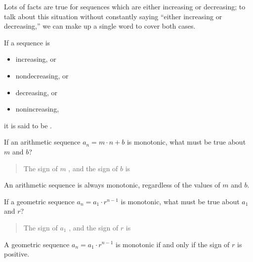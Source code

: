 \documentclass{ximera}
\begin{document}
Lots of facts are true for sequences which are either increasing or
decreasing; to talk about this situation without constantly saying
``either increasing or decreasing,'' we can make up a single word to
cover both cases.
\begin{definition}
  If a sequence is
  \begin{itemize}
  \item increasing, or
  \item nondecreasing, or
  \item decreasing, or
  \item nonincreasing,
  \end{itemize}
  it is said to be .
\end{definition}

\begin{question}
  If an arithmetic sequence $a_n = m\cdot n + b$ is monotonic, what
  must be true about $m$ and $b$?
  \begin{prompt}
    \begin{quote}
      The sign of $m$ , and the sign of $b$ is
    \end{quote}
  \end{prompt}
  \begin{feedback}
    An arithmetic sequence is always monotonic, regardless of the
    values of $m$ and $b$.
  \end{feedback}
\end{question}

\begin{question}
  If a geometric sequence $a_n = a_1 \cdot r^{n-1}$ is monotonic, what
  must be true about $a_1$ and $r$?
  \begin{prompt}
    \begin{quote}
      The sign of $a_1$ , and the sign of
      $r$ is 
    \end{quote}
  \end{prompt}
    \begin{feedback}
    A geometric sequence $a_n = a_1 \cdot r^{n-1}$ is monotonic if and
    only if the sign of $r$ is positive.
  \end{feedback}
\end{question}
\end{document}
